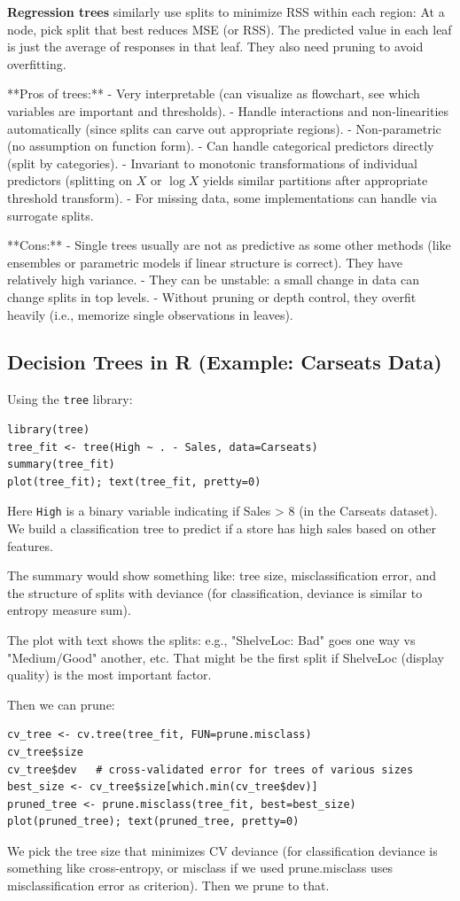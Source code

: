 \documentclass[11pt]{article}
\begin{document}
\textbf{Regression trees} similarly use splits to minimize RSS within each region:
At a node, pick split that best reduces MSE (or RSS). The predicted value in each leaf is just the average of responses in that leaf. They also need pruning to avoid overfitting.

**Pros of trees:**
- Very interpretable (can visualize as flowchart, see which variables are important and thresholds).
- Handle interactions and non-linearities automatically (since splits can carve out appropriate regions).
- Non-parametric (no assumption on function form).
- Can handle categorical predictors directly (split by categories).
- Invariant to monotonic transformations of individual predictors (splitting on $X$ or $\log X$ yields similar partitions after appropriate threshold transform).
- For missing data, some implementations can handle via surrogate splits.

**Cons:**
- Single trees usually are not as predictive as some other methods (like ensembles or parametric models if linear structure is correct). They have relatively high variance.
- They can be unstable: a small change in data can change splits in top levels.
- Without pruning or depth control, they overfit heavily (i.e., memorize single observations in leaves).

\subsection{Decision Trees in R (Example: Carseats Data)}
Using the \texttt{tree} library:
\begin{verbatim}
library(tree)
tree_fit <- tree(High ~ . - Sales, data=Carseats) 
summary(tree_fit)
plot(tree_fit); text(tree_fit, pretty=0)
\end{verbatim}
Here \texttt{High} is a binary variable indicating if Sales > 8 (in the Carseats dataset). We build a classification tree to predict if a store has high sales based on other features.

The summary would show something like: tree size, misclassification error, and the structure of splits with deviance (for classification, deviance is similar to entropy measure sum).

The plot with text shows the splits: e.g., "ShelveLoc: Bad" goes one way vs "Medium/Good" another, etc. That might be the first split if ShelveLoc (display quality) is the most important factor.

Then we can prune:
\begin{verbatim}
cv_tree <- cv.tree(tree_fit, FUN=prune.misclass)
cv_tree$size
cv_tree$dev   # cross-validated error for trees of various sizes
best_size <- cv_tree$size[which.min(cv_tree$dev)]
pruned_tree <- prune.misclass(tree_fit, best=best_size)
plot(pruned_tree); text(pruned_tree, pretty=0)
\end{verbatim}
We pick the tree size that minimizes CV deviance (for classification deviance is something like cross-entropy, or misclass if we used prune.misclass uses misclassification error as criterion). Then we prune to that.
\end{document}
